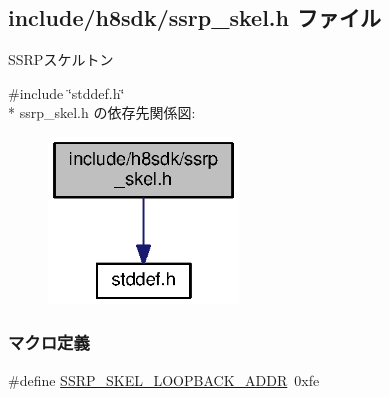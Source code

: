 \subsection{include/h8sdk/ssrp\+\_\+skel.h ファイル}
\label{ssrp__skel_8h}


S\+S\+R\+Pスケルトン  


{\ttfamily \#include \char`\"{}stddef.\+h\char`\"{}}\\*
ssrp\+\_\+skel.\+h の依存先関係図\+:
\nopagebreak
\begin{figure}[H]
\begin{center}
\leavevmode
\includegraphics[width=143pt]{de/d03/ssrp__skel_8h__incl}
\end{center}
\end{figure}
\subsubsection*{マクロ定義}
\begin{DoxyCompactItemize}
\item 
\#define \hyperlink{ssrp__skel_8h_afb8d035bce479337376e668f945a7108_afb8d035bce479337376e668f945a7108}{S\+S\+R\+P\+\_\+\+S\+K\+E\+L\+\_\+\+L\+O\+O\+P\+B\+A\+C\+K\+\_\+\+A\+D\+D\+R}~0xfe
\end{DoxyCompactItemize}
